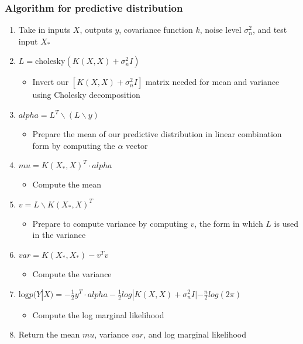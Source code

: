\subsubsection{Algorithm for predictive distribution}
\begin{enumerate}
    \item Take in inputs $X$, outputs $y$, covariance function $k$, noise level $\sigma^2_n$, and test input $X_*$
    \item $L = \text{cholesky}(K(X,X) + \sigma_n^2I)$
    \begin{itemize}
        \item Invert our $[K(X,X) + \sigma^2_nI]$ matrix needed for mean and variance using Cholesky decomposition
    \end{itemize}
    \item $alpha = L^T \backslash (L \backslash y)$
    \begin{itemize}
        \item Prepare the mean of our predictive distribution in linear combination form by computing the $\alpha$ vector
    \end{itemize}
    \item $mu = K(X_*, X)^T \cdot alpha$
    \begin{itemize}
        \item Compute the mean
    \end{itemize}
    \item $v = L \backslash K(X_*, X)^T$
    \begin{itemize}
        \item Prepare to compute variance by computing $v$, the form in which $L$ is used in the variance
    \end{itemize}
    \item $var = K(X_*, X_*) - v^T v$
    \begin{itemize}
        \item Compute the variance
    \end{itemize}
    \item $\text{log} p(Y|X) = -\frac{1}{2}y^T \cdot alpha - \frac{1}{2}log|K(X,X) + \sigma^2_nI| - \frac{n}{2}log(2\pi)$
    \begin{itemize}
        \item Compute the log marginal likelihood 
    \end{itemize}
    \item Return the mean $mu$, variance $var$, and log marginal likelihood
\end{enumerate}


